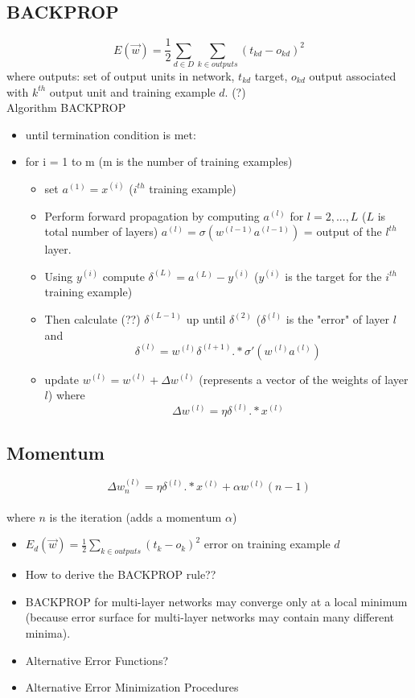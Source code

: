 \documentclass[11pt]{article}
\begin{document}
\subsection{\textsc{BACKPROP}}
$$E(\vec{w}) = \frac12 \sum_{d\in D} \sum_{k \in outputs}{(t_{kd} - o_{kd})^2}$$ where outputs: set of output units in network, $t_{kd}$ target, $o_{kd}$ output associated with $k^{th}$ output unit and training example $d$. (?)\\
{\color{red}Algorithm BACKPROP}
\begin{itemize}
\item until termination condition is met:
\item for i = 1 to m (m is the number of training examples)
\begin{itemize}
\item set $a^{(1)} = x^{(i)}$ ($i^{th}$ training example)
\item Perform forward propagation by computing $a^{(l)}$ for $l = 2,...,L$ ($L$ is total number of layers) $a^{(l)}= \sigma (w^{(l-1)}a^{(l-1)}) $ = output of the $l^{th}$ layer. 
\item Using $y^{(i)}$ compute $\delta^{(L)} = a^{(L)} - y^{(i)}$ ($y^{(i)}$ is the target for the $i^{th}$ training example)
\item Then calculate (??) $\delta^{(L-1)}$ up until $\delta^{(2)}$ ($\delta^{(l)}$ is the "error" of layer $l$ and $$\delta^{(l)} = w^{(l)}\delta^{(l+1)} .* \sigma'(w^{(l)} a^{(l)})$$
\item update $w^{(l)} = w^{(l)} + \Delta w^{(l)}$ (represents a vector of the weights of layer $l$) where  $$\Delta w^{(l)} = \eta \delta^{(l)}.*x^{(l)}$$
\end{itemize}
\end{itemize}

\subsection{Momentum}
$$\Delta w^{(l)}_n= \eta \delta^{(l)}.*x^{(l)} +\alpha w^{(l)} (n-1) $$\\ where $n$ is the iteration (adds a momentum $\alpha$)
\begin{itemize}
\item $E_d(\vec{w}) = \frac12 \sum_{k\in outputs}{(t_k - o_k)^2}$ error on training example $d$
\item How to derive the \textsc{BACKPROP} rule??
\item \textsc{BACKPROP} for multi-layer networks may converge only at a local minimum (because error surface for multi-layer networks may contain many different minima).
\item Alternative Error Functions?
\item Alternative Error Minimization Procedures
\end{itemize}
\end{document}
